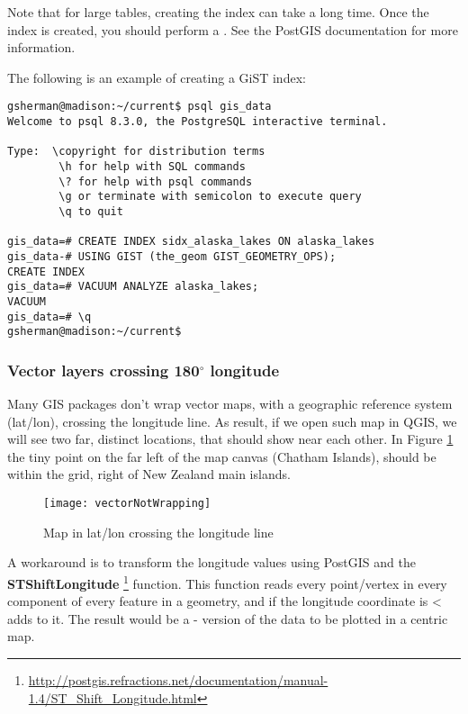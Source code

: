 Note that for large tables, creating the index can take a long time. Once the
index is created, you should perform a . See the
PostGIS documentation \cite{PostGISweb} for more information.

The following is an example of creating a GiST index:
\begin{verbatim}
gsherman@madison:~/current$ psql gis_data
Welcome to psql 8.3.0, the PostgreSQL interactive terminal.

Type:  \copyright for distribution terms
        \h for help with SQL commands
        \? for help with psql commands
        \g or terminate with semicolon to execute query
        \q to quit

gis_data=# CREATE INDEX sidx_alaska_lakes ON alaska_lakes
gis_data-# USING GIST (the_geom GIST_GEOMETRY_OPS);
CREATE INDEX
gis_data=# VACUUM ANALYZE alaska_lakes;
VACUUM
gis_data=# \q
gsherman@madison:~/current$
\end{verbatim}

\subsubsection{Vector layers crossing 180$^\circ$ longitude}

Many GIS packages don't wrap vector maps, with a geographic reference system
(lat/lon), crossing the  longitude line. As result, if
we open such map in QGIS, we will see two far, distinct locations, that
should show near each other. In Figure \ref{fig:vector_not_wrapping} the tiny
point on the far left of the map canvas (Chatham Islands), should be within
the grid, right of New Zealand main islands.

\begin{figure}[ht]
   \begin{center}
   \caption{Map in lat/lon crossing the  longitude line
   \nixcaption}
   \label{fig:vector_not_wrapping}\smallskip
   \texttt{[image: vectorNotWrapping]}
\end{center}
\end{figure}

A workaround is to transform the longitude values using PostGIS and the
\textbf{ST\textunderscore Shift\textunderscore Longitude}
\footnote{\url{http://postgis.refractions.net/documentation/manual-1.4/ST_Shift_Longitude.html}}
function. This function reads every point/vertex in every component of every
feature in a geometry, and if the longitude coordinate is <  adds
 to it. The result would be a  -  version of
the data to be plotted in a  centric map.

